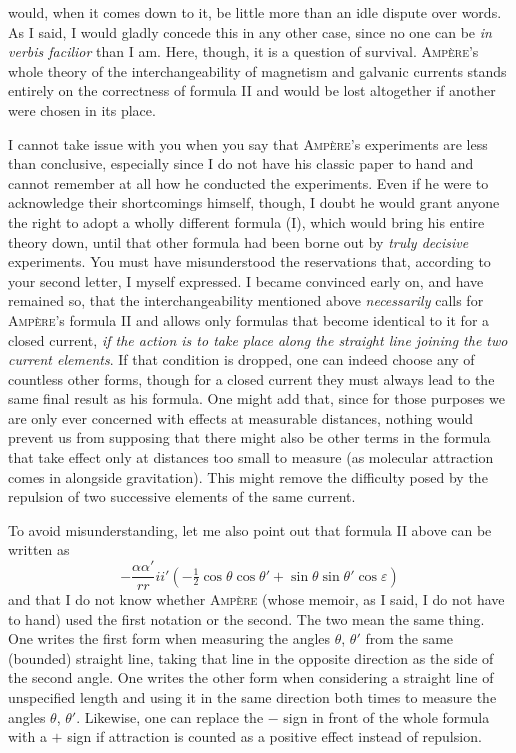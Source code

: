 would, when it comes down to it, be little more than an idle dispute over words. As I said, I would gladly concede this in any other case, since no one can be \textit{in verbis facilior} than I am. Here, though, it is a question of survival. \textsc{Ampère}’s whole theory of the interchangeability of magnetism and galvanic currents stands entirely on the correctness of formula II and would be lost altogether if another were chosen in its place.

I cannot take issue with you when you say that \textsc{Ampère}’s experiments are less than conclusive, especially since I do not have his classic paper to hand and cannot remember at all how he conducted the experiments. Even if he were to acknowledge their shortcomings himself, though, I doubt he would grant anyone the right to adopt a wholly different formula (I), which would bring his entire theory down, until that other formula had been borne out by \textit{truly decisive} experiments. You must have misunderstood the reservations that, according to your second letter, I myself expressed. I became convinced early on, and have remained so, that the interchangeability mentioned above \textit{necessarily} calls for \textsc{Ampère}’s formula II and allows only formulas that become identical to it for a closed current, \textit{if the action is to take place along the straight line joining the two current elements}. If that condition is dropped, one can indeed choose any of countless other forms, though for a closed current they must always lead to the same final result as his formula. One might add that, since for those purposes we are only ever concerned with effects at measurable distances, nothing would prevent us from supposing that there might also be other terms in the formula that take effect only at distances too small to measure (as molecular attraction comes in alongside gravitation). This might remove the difficulty posed by the repulsion of two successive elements of the same current.

To avoid misunderstanding, let me also point out that formula II above can be written as
\[
-\frac{\alpha\alpha'}{rr}ii'\left(-\tfrac12\cos\theta\cos\theta'+\sin\theta\sin\theta'\cos\varepsilon\right)
\]
and that I do not know whether \textsc{Ampère} (whose memoir, as I said, I do not have to hand) used the first notation or the second. The two mean the same thing. One writes the first form when measuring the angles $\theta$, $\theta'$ from the same (bounded) straight line, taking that line in the opposite direction as the side of the second angle. One writes the other form when considering a straight line of unspecified length and using it in the same direction both times to measure the angles $\theta$, $\theta'$. Likewise, one can replace the $-$ sign in front of the whole formula with a $+$ sign if attraction is counted as a positive effect instead of repulsion.

